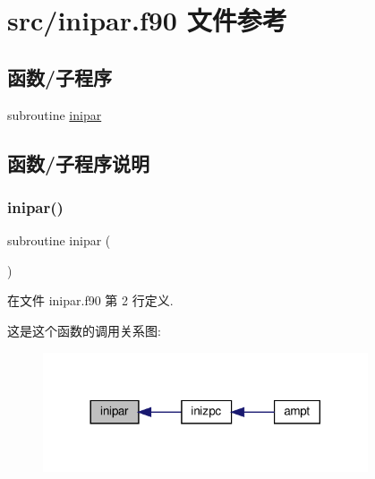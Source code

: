\hypertarget{inipar_8f90}{}\section{src/inipar.f90 文件参考}
\label{inipar_8f90}
\subsection*{函数/子程序}
\begin{DoxyCompactItemize}
\item 
subroutine \mbox{\hyperlink{inipar_8f90_a4fba7b5aed0f5df2d4d11fe725a6a794}{inipar}}
\end{DoxyCompactItemize}


\subsection{函数/子程序说明}
\mbox{\label{inipar_8f90_a4fba7b5aed0f5df2d4d11fe725a6a794}} 
\subsubsection{\texorpdfstring{inipar()}{inipar()}}
{\footnotesize\ttfamily subroutine inipar (\begin{DoxyParamCaption}{ }\end{DoxyParamCaption})}



在文件 inipar.\+f90 第 2 行定义.

这是这个函数的调用关系图\+:
\nopagebreak
\begin{figure}[H]
\begin{center}
\leavevmode
\includegraphics[width=272pt]{inipar_8f90_a4fba7b5aed0f5df2d4d11fe725a6a794_icgraph}
\end{center}
\end{figure}
